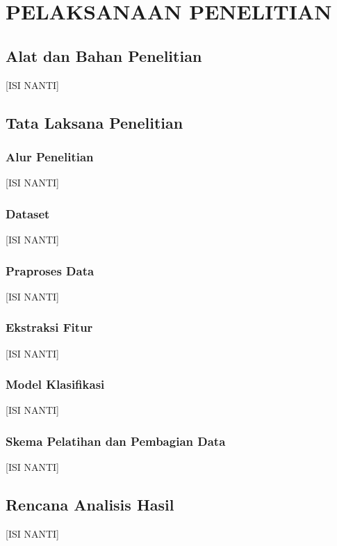 \chapter{PELAKSANAAN PENELITIAN}\label{pelaksanaan-penelitian}

\section{Alat dan Bahan Penelitian}\label{alat-bahan}
[ISI NANTI]

\section{Tata Laksana Penelitian}\label{tata-laksana}

\subsection{Alur Penelitian}
[ISI NANTI]

\subsection{Dataset}
[ISI NANTI]

\subsection{Praproses Data}
[ISI NANTI]

\subsection{Ekstraksi Fitur}
[ISI NANTI]

\subsection{Model Klasifikasi}
[ISI NANTI]

\subsection{Skema Pelatihan dan Pembagian Data}
[ISI NANTI]

\section{Rencana Analisis Hasil}\label{rencana-analisis}
[ISI NANTI]
